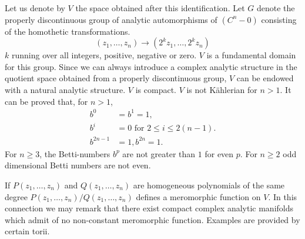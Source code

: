 Let us denote by $V$ the space obtained after this identification. Let
$G$ denote the properly discontinuous group of analytic automorphisms
of $(C^{n}-0)$ consisting of the homothetic transformations. 
$$
(z_{1},\ldots,z_{n})\to (2^{k}z_{1},\ldots,2^{k}z_{n})
$$
$k$ running over all integers, positive, negative or zero. $V$ is a
fundamental domain for this group. Since we can always introduce a
complex analytic structure in the quotient space obtained from a
properly discontinuous group, $V$ can be endowed with a natural
analytic structure. $V$ is compact. $V$ is not K\"ahlerian for
$n>1$. It can be proved that, for $n>1$,
\begin{align*}
b^{0} &= b^{1}=1,\\
b^{i} &= 0\text{ \ for \ } 2\leq i\leq 2(n-1).\\
b^{2n-1} &= 1, b^{2n}=1.
\end{align*}\pageoriginale 
For $n\geq 3$, the Betti-numbers $b^{p}$ are not greater than $1$ for
even $p$. For $n\geq 2$ odd dimensional Betti numbers are not even.

If $P(z_{1},\ldots,z_{n})$ and $Q(z_{1},\ldots,z_{n})$ are homogeneous
polynomials of the same degree
$P(z_{1},\ldots,z_{n})/Q(z_{1},\ldots,z_{n})$ defines a meromorphic
function on $V$. In this connection we may remark that there exist
compact complex analytic manifolds which admit of no non-constant
meromorphic function. Examples are provided by certain torii.




